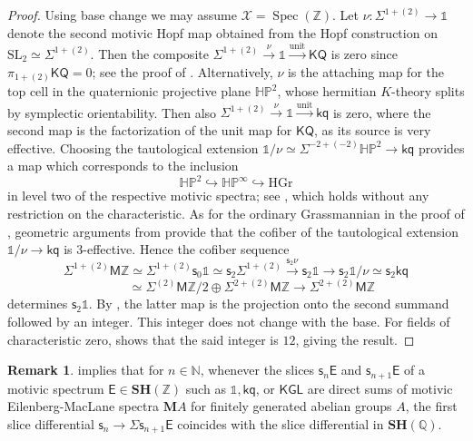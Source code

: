\documentclass[11pt,hyp,english]{article}
\newcommand{\E}{\mathsf{E}}
\newcommand{\Z}{\mathbb{Z}}
\newcommand{\N}{\mathbb{N}}
\newcommand{\Q}{\mathbb{Q}}
\newcommand{\unit}{\mathds{1}}
\newcommand{\HP}{\mathbb{HP}}
\newcommand{\SL}{\mathrm{SL}}
\newcommand{\KGL}{\mathsf{KGL}}
\newcommand{\KQ}{\mathsf{KQ}}
\newcommand{\kq}{\mathsf{kq}}
\newcommand{\MZ}{\mathsf{M}\Z}
\newcommand{\MA}{\mathbf{M}A}
\newcommand{\SH}{\mathbf{SH}}
\newcommand{\Spec}{\operatorname{Spec}}
\newcommand{\HGr}{\mathrm{HGr}}
\newcommand{\s}{\mathsf{s}}
\theoremstyle{definition}
\newtheorem{remark}[theorem]{Remark}
\begin{document}
\begin{proof}
Using base change we may assume $\mathcal{X}=\Spec(\Z)$.
Let $\nu\colon \Sigma^{1+(2)}\to \unit$ denote the second motivic Hopf map obtained from the 
Hopf construction on $\SL_2\simeq \Sigma^{1+(2)}$.
Then the composite $\Sigma^{1+(2)}\xrightarrow{\nu}\unit\xrightarrow{\mathrm{unit}}\KQ$ is zero since 
$\pi_{1+(2)}\KQ=0$; see the proof of .
Alternatively, 
$\nu$ is the attaching map for the top cell in the quaternionic projective plane $\HP^2$, 
whose hermitian $K$-theory splits by symplectic orientability.
Then also $\Sigma^{1+(2)}\xrightarrow{\nu} \unit\xrightarrow{\mathrm{unit}} \kq$ is zero, where the second map is the factorization of the unit map for $\KQ$, as its source is very effective.
Choosing the tautological extension $\unit/\nu\simeq\Sigma^{-2+(-2)}\HP^2 \to \kq$ provides a map which corresponds to the inclusion
\[ \HP^2\hookrightarrow \HP^\infty \hookrightarrow \HGr \]
in level two of the respective motivic spectra; see \cite[Theorem 2.6]{bachmann.jems}, 
which holds without any restriction on the characteristic.
As for the ordinary Grassmannian in the proof of , 
geometric arguments from \cite{panin-walter.quat-borel} provide that the cofiber of the 
tautological extension $\unit/\nu\to \kq$ is $3$-effective.
Hence the cofiber sequence
\[ \Sigma^{1+(2)}\MZ\simeq \Sigma^{1+(2)}\s_0\unit \simeq \s_2\Sigma^{1+(2)}\xrightarrow{\s_2\nu}\s_2\unit \to \s_2\unit/\nu \simeq \s_2\kq 
\]
\[
\,\,\,\,\,\,\,\,\,\,\,\,\,\,\,
\simeq \Sigma^{(2)}\MZ/2\oplus \Sigma^{2+(2)}\MZ \to \Sigma^{2+(2)}\MZ \]
determines $\s_2\unit$.
By , the latter map is the projection onto the second summand followed by an integer. 
This integer does not change with the base.
For fields of characteristic zero, 
\cite[Corollary 2.13]{zbMATH07003144} shows that the said integer is $12$, giving the result.
\end{proof}

\begin{remark}\label{rem:slice-diff-numberring}
 implies that for $n\in \N$, 
whenever the slices $\s_n\E$ and $\s_{n+1}\E$ of a motivic spectrum $\E\in \SH(\Z)$ 
such as $\unit,\kq$, or $\KGL$ are direct sums of motivic Eilenberg-MacLane spectra $\MA$ for finitely generated abelian groups $A$, 
the first slice differential $\s_n\to \Sigma\s_{n+1}\E$ coincides with the slice differential in $\SH(\Q)$.
\end{remark}
\end{document}
